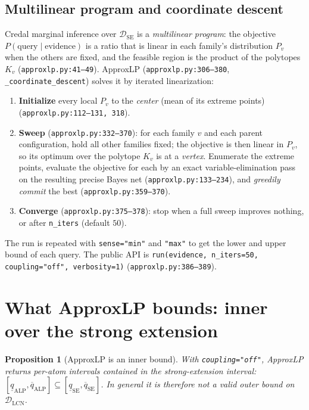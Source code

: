 \documentclass[11pt]{article}
\newtheorem{proposition}{Proposition}
\newcommand{\lo}{\underline}
\newcommand{\hi}{\overline}
\newcommand{\DSE}{\mathcal{D}_{\mathrm{SE}}}
\newcommand{\DLCN}{\mathcal{D}_{\mathrm{LCN}}}
\begin{document}
\subsection{Multilinear program and coordinate descent}\label{sec:cd}
Credal marginal inference over $\DSE$ is a \emph{multilinear program}: the objective
$P(\text{query}\mid\text{evidence})$ is a ratio that is linear in each family's distribution
$P_v$ when the others are fixed, and the feasible region is the product of the polytopes $K_v$
(\texttt{approxlp.py:41--49}). ApproxLP (\texttt{approxlp.py:306--380}, \texttt{\_coordinate\_descent})
solves it by iterated linearization:
\begin{enumerate}
  \item \textbf{Initialize} every local $P_v$ to the \emph{center} (mean of its extreme points)
    (\texttt{approxlp.py:112--131, 318}).
  \item \textbf{Sweep} (\texttt{approxlp.py:332--370}): for each family $v$ and each parent
    configuration, hold all other families fixed; the objective is then linear in $P_v$, so its
    optimum over the polytope $K_v$ is at a \emph{vertex}. Enumerate the extreme points, evaluate
    the objective for each by an exact variable-elimination pass on the resulting precise Bayes net
    (\texttt{approxlp.py:133--234}), and \emph{greedily commit} the best (\texttt{approxlp.py:359--370}).
  \item \textbf{Converge} (\texttt{approxlp.py:375--378}): stop when a full sweep improves nothing, or
    after \texttt{n\_iters} (default $50$).
\end{enumerate}
The run is repeated with \texttt{sense="min"} and \texttt{"max"} to get the lower and upper bound of
each query. The public API is
\texttt{run(evidence, n\_iters=50, coupling="off", verbosity=1)} (\texttt{approxlp.py:386--389}).

\section{What ApproxLP bounds: inner over the strong extension}\label{sec:bounds}

\begin{proposition}[ApproxLP is an inner bound]\label{prop:inner}
With \texttt{coupling="off"}, ApproxLP returns per-atom intervals \emph{contained in} the
strong-extension interval:
$[\lo q_{\mathrm{ALP}},\hi q_{\mathrm{ALP}}]\subseteq[\lo q_{\mathrm{SE}},\hi q_{\mathrm{SE}}]$.
In general it is therefore \emph{not} a valid outer bound on $\DLCN$.
\end{proposition}
\end{document}

